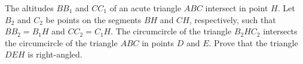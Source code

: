 The altitudes $BB_1$ and $CC_1$ of an acute triangle $ABC$ intersect in point $H$. Let $B_2$ and $C_2$ be points on the segments $BH$ and $CH$,  respectively, such that $BB_2=B_1H$ and $CC_2=C_1H$. The circumcircle of the triangle $B_2HC_2$ intersects the circumcircle of the triangle $ABC$ in points $D$ and $E$. Prove that the triangle $DEH$ is right-angled.